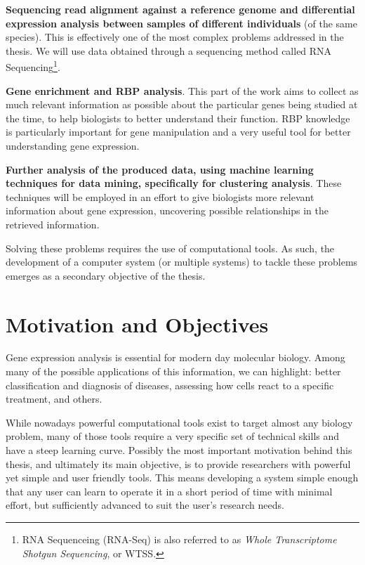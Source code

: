 \documentclass[9pt,a4paper]{extarticle}
\begin{document}
\begin{multicols}{2}
  \textbf{Sequencing read alignment against a reference genome and differential
  expression analysis between samples of different individuals} (of the same
  species). This is effectively one of the most complex problems addressed in
  the thesis. We will use data obtained through a sequencing method called RNA
  Sequencing\footnote{RNA Sequenceing (RNA-Seq) is also referred to as
  \textit{Whole Transcriptome Shotgun Sequencing}, or WTSS.}.

  \textbf{Gene enrichment and RBP analysis}. This part of the work aims to
  collect as much relevant information as possible about the particular genes
  being studied at the time, to help biologists to better understand their
  function. RBP knowledge is particularly important for gene manipulation and a
  very useful tool for better understanding gene expression.

  \textbf{Further analysis of the produced data, using machine learning
  techniques for data mining, specifically for clustering analysis}. These
  techniques will be employed in an effort to give biologists more relevant
  information about gene expression, uncovering possible relationships in the
  retrieved information.

Solving these problems requires the use of computational tools. As such, the
development of a computer system (or multiple systems) to tackle these problems
emerges as a secondary objective of the thesis.

\section{Motivation and Objectives} \label{sec:motivation}

Gene expression analysis is essential for modern day molecular biology. Among
many of the possible applications of this information, we can highlight: better
classification and diagnosis of diseases, assessing how cells react to a
specific treatment, and others.

While nowadays powerful computational tools exist to target almost any biology
problem, many of those tools require a very specific set of technical skills and
have a steep learning curve. Possibly the most important motivation behind this
thesis, and ultimately its main objective, is to provide researchers with
powerful yet simple and user friendly tools. This means developing a system
simple enough that any user can learn to operate it in a short period of time
with minimal effort, but sufficiently advanced to suit the user's research
needs.


\end{multicols}
\end{document}
